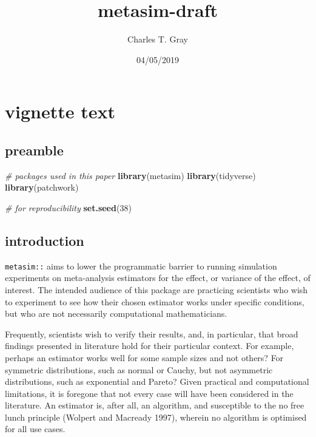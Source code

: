 \documentclass[]{article}
\title{metasim-draft}
\author{Charles T. Gray}
\date{04/05/2019}
\newenvironment{Shaded}{\begin{snugshade}}{\end{snugshade}}
\newcommand{\CommentTok}[1]{\textcolor[rgb]{0.56,0.35,0.01}{\textit{#1}}}
\newcommand{\DecValTok}[1]{\textcolor[rgb]{0.00,0.00,0.81}{#1}}
\newcommand{\KeywordTok}[1]{\textcolor[rgb]{0.13,0.29,0.53}{\textbf{#1}}}
\newcommand{\NormalTok}[1]{#1}
\begin{document}
\maketitle

\hypertarget{vignette-text}{%
\section{vignette text}\label{vignette-text}}

\hypertarget{preamble}{%
\subsection{preamble}\label{preamble}}

\begin{Shaded}
\begin{Highlighting}[]
\CommentTok{# packages used in this paper}
\KeywordTok{library}\NormalTok{(metasim)}
\KeywordTok{library}\NormalTok{(tidyverse)}
\KeywordTok{library}\NormalTok{(patchwork)}


\CommentTok{# for reproducibility}
\KeywordTok{set.seed}\NormalTok{(}\DecValTok{38}\NormalTok{)}
\end{Highlighting}
\end{Shaded}

\hypertarget{introduction}{%
\subsection{introduction}\label{introduction}}

\texttt{metasim::} aims to lower the programmatic barrier to running
simulation experiments on meta-analysis estimators for the effect, or
variance of the effect, of interest. The intended audience of this
package are practicing scientists who wish to experiment to see how
their chosen estimator works under specific conditions, but who are not
necessarily computational mathematicians.

Frequently, scientists wish to verify their results, and, in particular,
that broad findings presented in literature hold for their particular
context. For example, perhaps an estimator works well for some sample
sizes and not others? For symmetric distributions, such as normal or
Cauchy, but not asymmetric distributions, such as exponential and
Pareto? Given practical and computational limitations, it is foregone
that not every case will have been considered in the literature. An
estimator is, after all, an algorithm, and susceptible to the no free
lunch principle (Wolpert and Macready 1997), wherein no algorithm is
optimised for all use cases.
\end{document}
